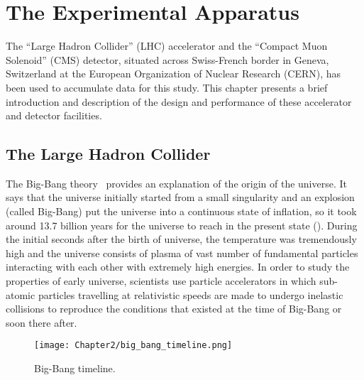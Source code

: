 \chapter{The Experimental Apparatus}
The ``Large Hadron Collider'' (LHC) accelerator and the ``Compact Muon Solenoid'' (CMS) detector, situated across Swiss-French border in Geneva, Switzerland
at the European Organization of Nuclear Research (CERN), has been used to accumulate data for this study. This chapter presents a brief introduction and
description of the design and performance of these accelerator and detector facilities.

\section{The Large Hadron Collider}
The Big-Bang theory~\cite{Gorbunov:2011zz} provides an explanation of the origin of the universe. It says that the universe initially started from a small singularity
and an explosion (called Big-Bang) put the universe into a continuous state of inflation, so it took around 13.7 billion years for the universe to reach in the
present state (\fig{\ref{fig:BigBang}}).
During the initial seconds after the birth of universe, the temperature was tremendously high and the universe consists of plasma of vast number
of fundamental particles interacting with each other with extremely high energies. In order to study the properties of early universe,
scientists use particle accelerators in which sub-atomic particles travelling at relativistic speeds are made to undergo inelastic collisions to reproduce the
conditions that existed at the time of Big-Bang or soon there after.

\begin{figure}[h]
\begin{center}
\texttt{[image: Chapter2/big\_bang\_timeline.png]}
\caption{Big-Bang timeline.}
\label{fig:BigBang}
\end{center}
\end{figure}

